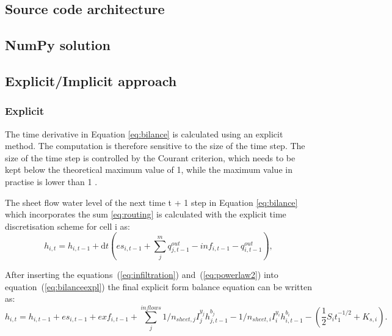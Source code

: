     \subsection{Source code architecture}

    \subsection{NumPy solution}



    \subsection{Explicit/Implicit approach}

        \subsubsection{Explicit}
            The time derivative in Equation \ref{eq:bilance} is calculated using an
            explicit method. The computation is therefore sensitive to the size of the time
            step. The size of the time step is controlled by the Courant criterion, which
            needs to be kept below the theoretical maximum value of 1, while the maximum
            value in practise is lower than 1 
            \cite{zhang1989modeling, esteves2000overland}.


            The sheet flow water level of the next time t + 1 step in Equation
            \ref{eq:bilance} which incorporates the sum \ref{eq:routing} is calculated with the
            explicit time discretisation scheme for cell i as:
            \begin{equation} 
            h_{i,t} =h_{i,t-1} + \mathrm{d}t (es_{i,t-1} + \sum_j^m q^{out}_{j,t-1}-
            inf_{i,t-1} - q^{out}_{i,t-1}),
            \label{eq:bilanceexpl}
            \end{equation}


           After inserting the equations~(\ref{eq:infiltration})
           and~(\ref{eq:powerlaw2}) into equation~(\ref{eq:bilanceexpl}) the
           final explicit form balance equation can be written as:
            \begin{dmath}
              h_{i,t} = h_{i,t-1} +
              es_{i,t-1}  + exf_{i,t-1} +  \sum_{j}^{inflows}
              1/n_{sheet,j}I_j^{y_j} h_{j,t-1}^{b_j} -
              1/n_{sheet,i}I_i^{y_i}h_{i,t-1}^{b_i} - ( 
              \frac{1}{2}S_it_1^{-1/2}+K_{s,i}).
            \end{dmath}


